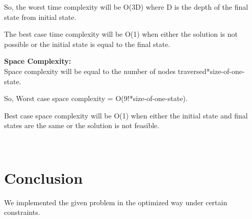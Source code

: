 \documentclass[conference]{IEEEtran}
\begin{document}
So, the worst time complexity will be O(3D) where D is the depth of the final state from initial state.

The best case time complexity will be O(1) when either the solution is not possible or the initial state is equal to the final state. 

\textbf{Space Complexity:} \\

Space complexity will be equal to the number of nodes traversed*size-of-one-state. 

So, Worst case space complexity = O(9!*size-of-one-state). 

Best case space complexity will be O(1) when either the initial state and final states are the same or the solution is not feasible.

\\
\section{Conclusion}
We implemented the given problem in the optimized way under certain constraints.
\end{document}
